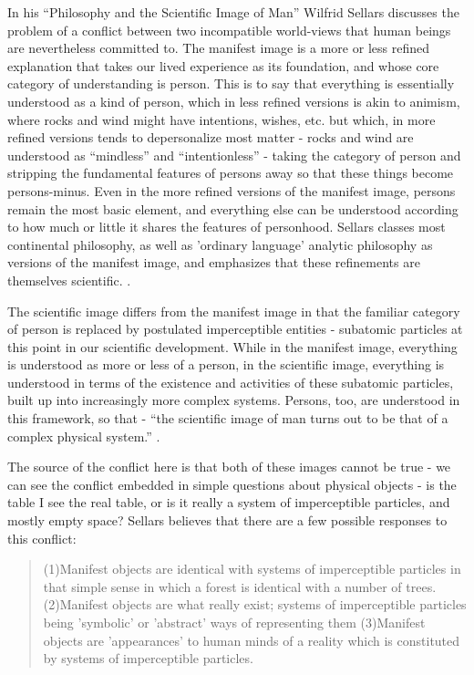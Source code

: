 \documentclass[phd,12pt,oneside,paper=letterpaper]{ubcthesis}
\begin{document}
In his ``Philosophy and the Scientific Image of Man'' Wilfrid Sellars discusses the problem of a conflict between two incompatible world-views that human beings are nevertheless committed to. The manifest image is a more or less refined explanation that takes our lived experience as its foundation, and whose core category of understanding is person. This is to say that everything is essentially understood as a kind of person, which in less refined versions is akin to animism, where rocks and wind might have intentions, wishes, etc. but which, in more refined versions tends to depersonalize most matter - rocks and wind are understood as ``mindless'' and ``intentionless'' - taking the category of person and stripping the fundamental features of persons away so that these things become persons-minus. Even in the more refined versions of the manifest image, persons remain the most basic element, and everything else can be understood according to how much or little it shares the features of personhood. Sellars classes most continental philosophy, as well as 'ordinary language' analytic philosophy as versions of the manifest image, and emphasizes that these refinements are themselves scientific. \citep[p.494-5]{sellars1962}.

The scientific image differs from the manifest image in that the familiar category of person is replaced by postulated imperceptible entities - subatomic particles at this point in our scientific development. While in the manifest image, everything is understood as more or less of a person, in the scientific image, everything is understood in terms of the existence and activities of these subatomic particles, built up into increasingly more complex systems. Persons, too, are understood in this framework, so that - ``the scientific image of man turns out to be that of a complex physical system.'' \citep{sellars1962}.

The source of the conflict here is that both of these images cannot be true - we can see the conflict embedded in simple questions about physical objects - is the table I see the real table, or is it really a system of imperceptible particles,  and mostly empty space? Sellars believes that there are a few possible responses to this conflict:
\begin{quote}
(1)Manifest objects are identical with systems of imperceptible particles in that simple sense in which a forest is identical with a number of trees.
(2)Manifest objects are what really exist; systems of imperceptible particles being 'symbolic' or 'abstract' ways of representing them
(3)Manifest objects are 'appearances' to human minds of a reality which is constituted by systems of imperceptible particles. \citep[p.506]{sellars1962}
\end{quote}
\end{document}
